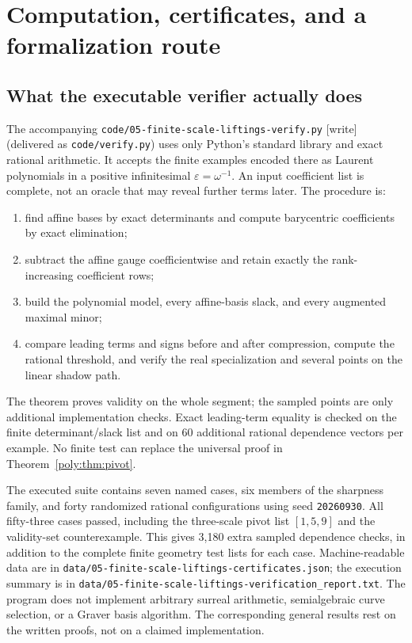 \documentclass[11pt,a4paper]{article}
\numberwithin{equation}{section}
\theoremstyle{plain}
\newcommand{\wtag}{\textup{[write]}}%
\newcommand{\eps}{\varepsilon}
\begin{document}
\section{Computation, certificates, and a formalization route}
\label{poly:sec:computation}

\subsection{What the executable verifier actually does}

The accompanying \nolinkurl{code/05-finite-scale-liftings-verify.py} \wtag{} (delivered as \nolinkurl{code/verify.py}) uses only Python's standard
library and exact rational arithmetic. It accepts the finite examples
encoded there as Laurent polynomials in a positive infinitesimal
$\eps=\omega^{-1}$. An input coefficient list is complete, not an oracle
that may reveal further terms later. The procedure is:
\begin{enumerate}[label=\arabic*.]
\item find affine bases by exact determinants and compute barycentric
      coefficients by exact elimination;
\item subtract the affine gauge coefficientwise and retain exactly the
      rank-increasing coefficient rows;
\item build the polynomial model, every affine-basis slack, and every
      augmented maximal minor;
\item compare leading terms and signs before and after compression,
      compute the rational threshold, and verify the real specialization
      and several points on the linear shadow path.
\end{enumerate}
The theorem proves validity on the whole segment; the sampled points are
only additional implementation checks. Exact leading-term equality is
checked on the finite determinant/slack list and on 60 additional rational
dependence vectors per example. No finite test can replace the universal
proof in Theorem~\ref{poly:thm:pivot}.

The executed suite contains seven named cases, six members of the sharpness
family, and forty randomized rational configurations using seed
\texttt{20260930}. All fifty-three cases passed, including the three-scale pivot
list $[1,5,9]$ and the validity-set counterexample. This gives 3,180 extra
sampled dependence checks, in addition to the complete finite geometry
test lists for each case. Machine-readable data are in
\nolinkurl{data/05-finite-scale-liftings-certificates.json}; the execution summary is in
\nolinkurl{data/05-finite-scale-liftings-verification_report.txt}. The program does not implement
arbitrary surreal arithmetic, semialgebraic curve selection, or a Graver
basis algorithm. The corresponding general results rest on the written
proofs, not on a claimed implementation.
\end{document}
